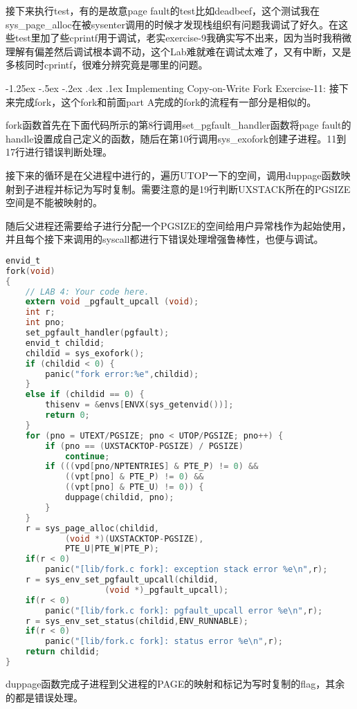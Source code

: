 \documentclass[11pt,a4paper]{article}
\makeatletter
\newcommand{\sihao}{\fontsize{14pt}{\baselineskip}\selectfont}
\renewcommand\subsection{\@startsection{subsection}{1}{\z@}%
{-1.25ex \@plus -.5ex \@minus -.2ex}%
{.4ex \@plus .1ex}%
{\normalfont\sihao\fontspec{黑体}}}
\makeatother
\begin{document}
接下来执行test，有的是故意page fault的test比如deadbeef，这个测试我在sys\_page\_alloc在被sysenter调用的时候才发现栈组织有问题我调试了好久。在这些test里加了些cprintf用于调试，老实exercise-9我确实写不出来，因为当时我稍微理解有偏差然后调试根本调不动，这个Lab难就难在调试太难了，又有中断，又是多核同时cprintf，很难分辨究竟是哪里的问题。

\subsection{Implementing Copy-on-Write Fork}
\color{red}Exercise-11:\color{black}
接下来完成fork，这个fork和前面part A完成的fork的流程有一部分是相似的。

fork函数首先在下面代码所示的第8行调用set\_pgfault\_handler函数将page fault的handle设置成自己定义的函数，随后在第10行调用sys\_exofork创建子进程。11到17行进行错误判断处理。

接下来的循环是在父进程中进行的，遍历UTOP一下的空间，调用duppage函数映射到子进程并标记为写时复制。需要注意的是19行判断UXSTACK所在的PGSIZE空间是不能被映射的。

随后父进程还需要给子进行分配一个PGSIZE的空间给用户异常栈作为起始使用，并且每个接下来调用的syscall都进行下错误处理增强鲁棒性，也便与调试。

\setmainfont{Consolas}
\begin{lstlisting}[language={C},firstnumber=1,title=lib/fork.c]
envid_t
fork(void)
{
	// LAB 4: Your code here.
	extern void _pgfault_upcall (void);
	int r;
	int pno;
	set_pgfault_handler(pgfault);
	envid_t childid;
	childid = sys_exofork();
	if (childid < 0) {
		panic("fork error:%e",childid);
	}
	else if (childid == 0) {
		thisenv = &envs[ENVX(sys_getenvid())];
		return 0;
	}
	for (pno = UTEXT/PGSIZE; pno < UTOP/PGSIZE; pno++) {
		if (pno == (UXSTACKTOP-PGSIZE) / PGSIZE)
			continue;
		if (((vpd[pno/NPTENTRIES] & PTE_P) != 0) && 
			((vpt[pno] & PTE_P) != 0) && 
			((vpt[pno] & PTE_U) != 0)) {
			duppage(childid, pno);
		}
	}
	r = sys_page_alloc(childid,
			(void *)(UXSTACKTOP-PGSIZE),
			PTE_U|PTE_W|PTE_P);
	if(r < 0)
		panic("[lib/fork.c fork]: exception stack error %e\n",r);	
	r = sys_env_set_pgfault_upcall(childid,
					(void *)_pgfault_upcall);
	if(r < 0)
		panic("[lib/fork.c fork]: pgfault_upcall error %e\n",r);
	r = sys_env_set_status(childid,ENV_RUNNABLE);
	if(r < 0)
		panic("[lib/fork.c fork]: status error %e\n",r);
	return childid;
}
\end{lstlisting}
\setmainfont[BoldFont=黑体]{宋体}

duppage函数完成子进程到父进程的PAGE的映射和标记为写时复制的flag，其余的都是错误处理。
\end{document}
